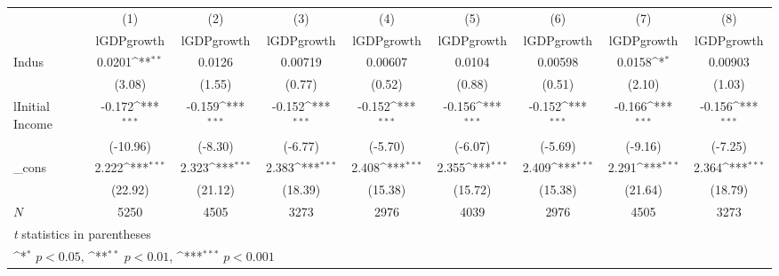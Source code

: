 \documentclass{article}
\begin{document}
{
\def\sym#1{\ifmmode^{#1}\else\(^{#1}\)\fi}
\begin{tabular}{l*{8}{c}}
\hline\hline
            &\multicolumn{1}{c}{(1)}&\multicolumn{1}{c}{(2)}&\multicolumn{1}{c}{(3)}&\multicolumn{1}{c}{(4)}&\multicolumn{1}{c}{(5)}&\multicolumn{1}{c}{(6)}&\multicolumn{1}{c}{(7)}&\multicolumn{1}{c}{(8)}\\
            &\multicolumn{1}{c}{lGDPgrowth}&\multicolumn{1}{c}{lGDPgrowth}&\multicolumn{1}{c}{lGDPgrowth}&\multicolumn{1}{c}{lGDPgrowth}&\multicolumn{1}{c}{lGDPgrowth}&\multicolumn{1}{c}{lGDPgrowth}&\multicolumn{1}{c}{lGDPgrowth}&\multicolumn{1}{c}{lGDPgrowth}\\
\hline
Indus       &      0.0201\sym{**} &      0.0126         &     0.00719         &     0.00607         &      0.0104         &     0.00598         &      0.0158\sym{*}  &     0.00903         \\
            &      (3.08)         &      (1.55)         &      (0.77)         &      (0.52)         &      (0.88)         &      (0.51)         &      (2.10)         &      (1.03)         \\
[1em]
lInitial Income    &      -0.172\sym{***}&      -0.159\sym{***}&      -0.152\sym{***}&      -0.152\sym{***}&      -0.156\sym{***}&      -0.152\sym{***}&      -0.166\sym{***}&      -0.156\sym{***}\\
            &    (-10.96)         &     (-8.30)         &     (-6.77)         &     (-5.70)         &     (-6.07)         &     (-5.69)         &     (-9.16)         &     (-7.25)         \\
[1em]
\_cons      &       2.222\sym{***}&       2.323\sym{***}&       2.383\sym{***}&       2.408\sym{***}&       2.355\sym{***}&       2.409\sym{***}&       2.291\sym{***}&       2.364\sym{***}\\
            &     (22.92)         &     (21.12)         &     (18.39)         &     (15.38)         &     (15.72)         &     (15.38)         &     (21.64)         &     (18.79)         \\
\hline
\(N\)       &        5250         &        4505         &        3273         &        2976         &        4039         &        2976         &        4505         &        3273         \\
\hline\hline
\multicolumn{9}{l}{\footnotesize \textit{t} statistics in parentheses}\\
\multicolumn{9}{l}{\footnotesize \sym{*} \(p<0.05\), \sym{**} \(p<0.01\), \sym{***} \(p<0.001\)}\\
\end{tabular}
}
\\
\end{document}
